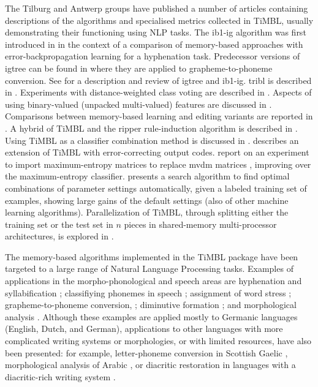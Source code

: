 \documentclass{report}
\begin{document}
The Tilburg and Antwerp groups have published a number of articles
containing descriptions of the algorithms and specialised metrics
collected in TiMBL, usually demonstrating their functioning using NLP
tasks. The {\sc ib1-ig} algorithm was first introduced in
\cite{Daelemans+92b} in the context of a comparison of memory-based
approaches with error-back\-propagation learning for a hyphenation
task.  Predecessor versions of {\sc igtree} can be found in
\cite{Daelemans+93c,VandenBosch+93} where they are applied to
grapheme-to-phoneme conversion.  See \cite{Daelemans+97} for a
description and review of {\sc igtree} and {\sc ib1-ig}. {\sc tribl}
is described in \cite{Daelemans+97d}.  Experiments with
distance-weighted class voting are described in
\cite{Zavrel97}. Aspects of using binary-valued (unpacked
multi-valued) features are discussed in \cite{VandenBosch+00}.
Comparisons between memory-based learning and editing variants are
reported in \cite{VandenBosch99,Daelemans+99}. A hybrid of TiMBL and
the {\sc ripper} rule-induction algorithm \cite{Cohen95} is described
in \cite{VandenBosch00,VandenBosch04}. Using TiMBL as a classifier
combination method is discussed in
\cite{Halteren+01}.  describes an extension of
TiMBL with error-correcting output codes. 
report on an experiment to import maximum-entropy matrices to replace
{\sc mvdm} matrices \cite{Hendrickx+04}, improving over the
maximum-entropy classifier.  presents a search
algorithm to find optimal combinations of parameter settings
automatically, given a labeled training set of examples, showing large
gains of the default settings (also of other machine learning
algorithms). Parallelization of TiMBL, through splitting either the
training set or the test set in $n$ pieces in shared-memory
multi-processor architectures, is explored in \cite{VandenBosch+07b}.

The memory-based algorithms implemented in the TiMBL package have been
targeted to a large range of Natural Language Processing
tasks. Examples of applications in the morpho-phonological and speech
areas are hyphenation and syllabification \cite{Daelemans+92b};
classifiying phonemes in speech \cite{Kocsor+00}; assignment of word
stress \cite{Daelemans+94}; grapheme-to-phoneme conversion,
\cite{VandenBosch+93,Daelemans+96,Canisius+06}; diminutive formation
\cite{Daelemans+98a}; and morphological analysis
\cite{VandenBosch+96,VandenBosch+99,Canisius+06}. Although these
examples are applied mostly to Germanic languages (English, Dutch, and
German), applications to other languages with more complicated writing
systems or morphologies, or with limited resources, have also been
presented: for example, letter-phoneme conversion in Scottish Gaelic
\cite{Wolters+97}, morphological analysis of Arabic \cite{Marsi+05},
or diacritic restoration in languages with a diacritic-rich writing
system \cite{Mihalcea02,DePauw+07}.
\end{document}
